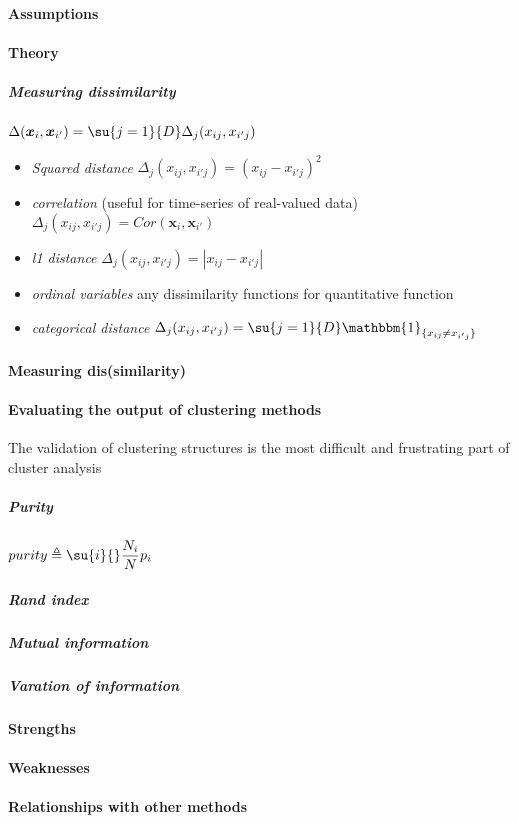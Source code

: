 \paragraph{Assumptions}
\paragraph{Theory}
\subparagraph{Measuring dissimilarity}
$\Delta(\bm{x}_{i}, \bm{x}_{i'}) = \su{j=1}{D}\Delta_{j}(x_{ij},x_{i'j})$
\begin{itemize}
    \item \emph{Squared distance} $\Delta_{j}(x_{ij},x_{i'j}) = (x_{ij}-x_{i'j})^{2}$
    \item \emph{correlation} (useful for time-series of real-valued data) 
        $\Delta_{j}(x_{ij},x_{i'j}) = Cor(\bm{x}_{i},\bm{x}_{i'})$
    \item \emph{l1 distance} $\Delta_{j}(x_{ij},x_{i'j}) = |x_{ij}-x_{i'j}|$
    \item \emph{ordinal variables} any dissimilarity functions for quantitative function
     \item \emph{categorical distance} $\Delta_{j}(x_{ij},x_{i'j}) = \su{j=1}{D}\mathbbm{1}_{\{x_{ij}
         \neq x_{i'j}\}}$
\end{itemize}

\paragraph{Measuring dis(similarity)}
\paragraph{Evaluating the output of clustering methods}
The validation of clustering structures is the most difficult and frustrating part of cluster
analysis
\subparagraph{Purity}
$purity\triangleq \su{i}{}\dfrac{N_{i}}{N}p_{i}$
\subparagraph{Rand index}
\subparagraph{Mutual information}
\subparagraph{Varation of information}

\paragraph{Strengths}
\paragraph{Weaknesses}
\paragraph{Relationships with other methods}
